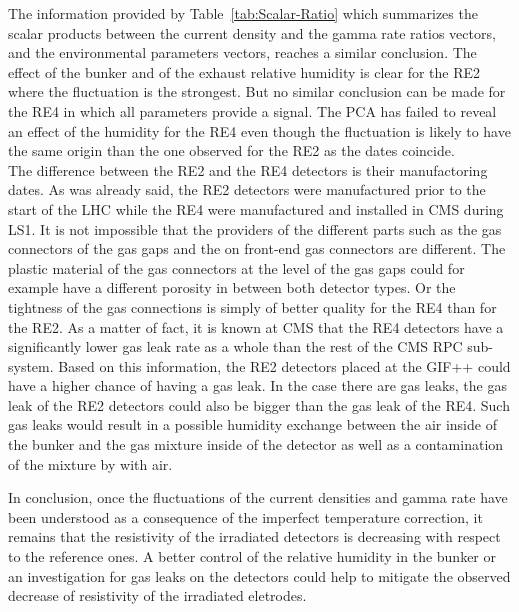 	The information provided by Table~\ref{tab:Scalar-Ratio} which summarizes the scalar products between the current density and the gamma rate ratios vectors, and the environmental parameters vectors, reaches a similar conclusion. The effect of the bunker and of the exhaust relative humidity is clear for the RE2 where the fluctuation is the strongest. But no similar conclusion can be made for the RE4 in which all parameters provide a signal. The PCA has failed to reveal an effect of the humidity for the RE4 even though the fluctuation is likely to have the same origin than the one observed for the RE2 as the dates coincide.\\
	The difference between the RE2 and the RE4 detectors is their manufactoring dates. As was already said, the RE2 detectors were manufactured prior to the start of the LHC while the RE4 were manufactured and installed in CMS during LS1. It is not impossible that the providers of the different parts such as the gas connectors of the gas gaps and the on front-end gas connectors are different. The plastic material of the gas connectors at the level of the gas gaps could for example have a different porosity in between both detector types. Or the tightness of the gas connections is simply of better quality for the RE4 than for the RE2. As a matter of fact, it is known at CMS that the RE4 detectors have a significantly lower gas leak rate as a whole than the rest of the CMS RPC sub-system. Based on this information, the RE2 detectors placed at the GIF++ could have a higher chance of having a gas leak. In the case there are gas leaks, the gas leak of the RE2 detectors could also be bigger than the gas leak of the RE4. Such gas leaks would result in a possible humidity exchange between the air inside of the bunker and the gas mixture inside of the detector as well as a contamination of the mixture by with air.

\endgroup
	
	In conclusion, once the fluctuations of the current densities and gamma rate have been understood as a consequence of the imperfect temperature correction, it remains that the resistivity of the irradiated detectors is decreasing with respect to the reference ones. A better control of the relative humidity in the bunker or an investigation for gas leaks on the detectors could help to mitigate the observed decrease of resistivity of the irradiated eletrodes.
	
\newpage
	

